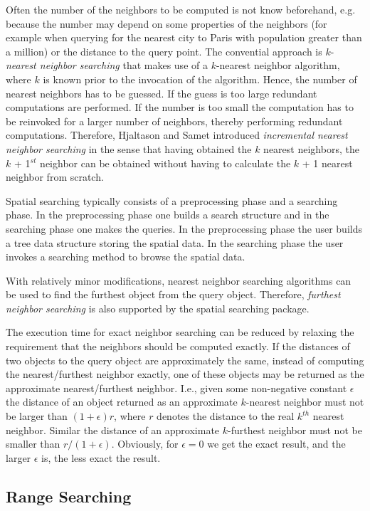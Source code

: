 Often the number of the neighbors to be computed is not know
beforehand, e.g. because the number may depend on some properties of
the neighbors (for example when querying for the nearest city to Paris with
population greater than a million) or the distance to the query point.
The convential approach is $k$-{\em nearest neighbor searching} that
makes use of a $k$-nearest neighbor algorithm, where $k$ is known
prior to the invocation of the algorithm.  Hence, the number of
nearest neighbors has to be guessed. If the guess is too large
redundant computations are performed.  If the number is too small the
computation has to be reinvoked for a larger number of neighbors,
thereby performing redundant computations.  Therefore, Hjaltason and
Samet \cite{hs-rsd-95} introduced {\em incremental nearest neighbor
searching} in the sense that having obtained the $k$ nearest
neighbors, the $k$ + 1$^{st}$ neighbor can be obtained without having
to calculate the $k$ + 1 nearest neighbor from scratch.
 

Spatial searching typically consists of a preprocessing phase and a
searching phase.  In the preprocessing phase one builds a search
structure and in the searching phase one makes the queries.  In the
preprocessing phase the user builds a tree data structure
storing the spatial data.  In the searching phase the user invokes a
searching method to browse the spatial data.

With relatively minor modifications, nearest neighbor searching
algorithms can be used to find the furthest object from the query
object.  Therefore, {\em furthest neighbor searching} is also
supported by the spatial searching package.

The execution time for exact neighbor searching can be reduced by
relaxing the requirement that the neighbors should be computed
exactly.  If the distances of two objects to the query object are
approximately the same, instead of computing the nearest/furthest
neighbor exactly, one of these objects may be returned as the
approximate nearest/furthest neighbor. I.e., given some non-negative
constant $\epsilon$ the distance of an object returned as an
approximate $k$-nearest neighbor must not be larger than
$(1+\epsilon)r$, where $r$ denotes the distance to the real $k^{th}$
nearest neighbor.  Similar the distance of an approximate $k$-furthest
neighbor must not be smaller than $r/(1+\epsilon)$.  Obviously, for
$\epsilon=0$ we get the exact result, and the larger $\epsilon$ is,
the less exact the result.

\subsection{Range Searching}

